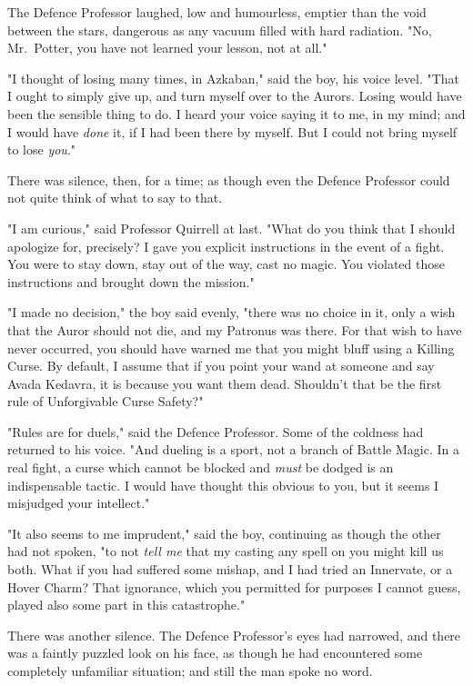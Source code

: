The Defence Professor laughed, low and humourless, emptier than the void between
the stars, dangerous as any vacuum filled with hard radiation. "No, Mr.~Potter,
you have not learned your lesson, not at all."

"I thought of losing many times, in Azkaban," said the boy, his voice level.
"That I ought to simply give up, and turn myself over to the Aurors. Losing
would have been the sensible thing to do. I heard your voice saying it to me,
in my mind; and I would have \emph{done} it, if I had been there by myself. But
I could not bring myself to lose \emph{you}."

There was silence, then, for a time; as though even the Defence Professor could
not quite think of what to say to that.

"I am curious," said Professor Quirrell at last. "What do you think that I
should apologize for, precisely? I gave you explicit instructions in the event
of a fight. You were to stay down, stay out of the way, cast no magic. You
violated those instructions and brought down the mission."

"I made no decision," the boy said evenly, "there was no choice in it, only a
wish that the Auror should not die, and my Patronus was there. For that wish to
have never occurred, you should have warned me that you might bluff using a
Killing Curse. By default, I assume that if you point your wand at someone and
say Avada Kedavra, it is because you want them dead. Shouldn't that be the
first rule of Unforgivable Curse Safety?"

"Rules are for duels," said the Defence Professor. Some of the coldness had
returned to his voice. "And dueling is a sport, not a branch of Battle Magic.
In a real fight, a curse which cannot be blocked and \emph{must} be dodged is
an indispensable tactic. I would have thought this obvious to you, but it seems
I misjudged your intellect."

"It also seems to me imprudent," said the boy, continuing as though the other
had not spoken, "to not \emph{tell me} that my casting any spell on you might
kill us both. What if you had suffered some mishap, and I had tried an
Innervate, or a Hover Charm? That ignorance, which you permitted for purposes I
cannot guess, played also some part in this catastrophe."

There was another silence. The Defence Professor's eyes had narrowed, and there
was a faintly puzzled look on his face, as though he had encountered some
completely unfamiliar situation; and still the man spoke no word.


